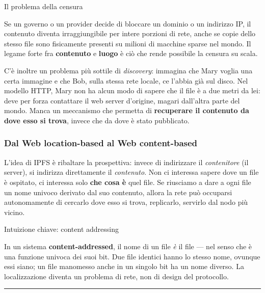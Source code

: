\documentclass[
  italian,
  openany]{book}
\begin{document}
\begin{calloutwarning}{Il problema della censura}

Se un governo o un provider decide di bloccare un dominio o un indirizzo
IP, il contenuto diventa irraggiungibile per intere porzioni di rete,
anche se copie dello stesso file sono fisicamente presenti su milioni di
macchine sparse nel mondo. Il legame forte fra \textbf{contenuto} e
\textbf{luogo} è ciò che rende possibile la censura su scala.

\end{calloutwarning}

C'è inoltre un problema più sottile di \emph{discovery}: immagina che
Mary voglia una certa immagine e che Bob, sulla stessa rete locale, ce
l'abbia già sul disco. Nel modello HTTP, Mary non ha alcun modo di
sapere che il file è a due metri da lei: deve per forza contattare il
web server d'origine, magari dall'altra parte del mondo. Manca un
meccanismo che permetta di \textbf{recuperare il contenuto da dove esso
si trova}, invece che da dove è stato pubblicato.

\subsubsection{Dal Web location-based al Web
content-based}\label{dal-web-location-based-al-web-content-based}

L'idea di IPFS è ribaltare la prospettiva: invece di indirizzare il
\emph{contenitore} (il server), si indirizza direttamente il
\emph{contenuto}. Non ci interessa sapere dove un file è ospitato, ci
interessa solo \textbf{che cosa è} quel file. Se riusciamo a dare a ogni
file un nome univoco derivato dal suo contenuto, allora la rete può
occuparsi autonomamente di cercarlo dove esso si trova, replicarlo,
servirlo dal nodo più vicino.

\begin{callouttip}{Intuizione chiave: content addressing}

In un sistema \textbf{content-addressed}, il nome di un file \emph{è} il
file --- nel senso che è una funzione univoca dei suoi bit. Due file
identici hanno lo stesso nome, ovunque essi siano; un file manomesso
anche in un singolo bit ha un nome diverso. La localizzazione diventa un
problema di rete, non di design del protocollo.

\end{callouttip}

\begin{center}\rule{0.5\linewidth}{0.5pt}\end{center}
\end{document}
